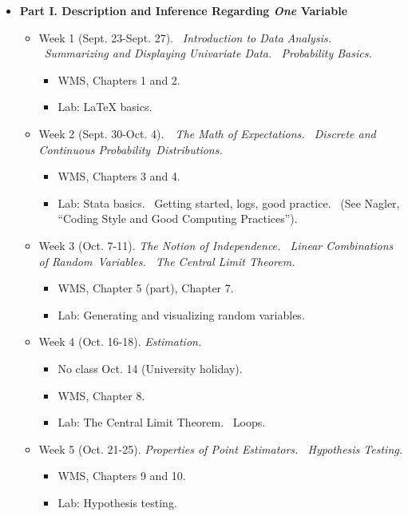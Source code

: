 \documentclass[11pt]{article}
\begin{document}
\begin{itemize}
\item \textbf{Part I. Description and Inference Regarding \textit{One}
Variable}

\begin{itemize}
\item Week 1 (Sept. 23-Sept. 27). \textit{\ Introduction to Data Analysis. \
Summarizing and Displaying Univariate Data. \ Probability Basics.}

\begin{itemize}
\item WMS, Chapters 1 and 2. \ 

\item Lab: LaTeX basics. \bigskip\ 
\end{itemize}

\item Week 2 (Sept. 30-Oct. 4).\textit{\ \ The Math of Expectations. \
Discrete and Continuous Probability\ Distributions.}

\begin{itemize}
\item WMS, Chapters 3 and 4.

\item Lab: Stata basics. \ Getting started, logs, good practice. \ (See
Nagler, \textquotedblleft Coding Style and Good Computing
Practices\textquotedblright ).\bigskip
\end{itemize}

\item Week 3 (Oct. 7-11). \textit{The Notion of Independence. \ Linear
Combinations of Random\ Variables. \ The Central Limit Theorem.}

\begin{itemize}
\item WMS, Chapter 5 (part), Chapter 7.

\item Lab: Generating and visualizing random variables. \bigskip
\end{itemize}

\item Week 4 (Oct. 16-18). \textit{Estimation. \ }

\begin{itemize}
\item No class Oct. 14 (University holiday).

\item WMS, Chapter 8.

\item Lab: The Central Limit Theorem. \ Loops.\bigskip
\end{itemize}

\item Week 5 (Oct. 21-25). \textit{Properties of Point Estimators. \
Hypothesis Testing.}

\begin{itemize}
\item WMS, Chapters 9 and 10.

\item Lab: Hypothesis testing.\bigskip
\end{itemize}
\end{itemize}
\end{itemize}
\end{document}
